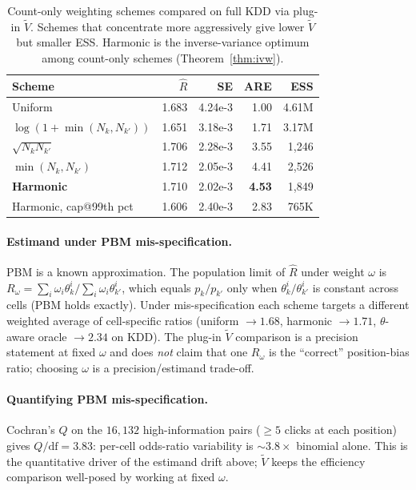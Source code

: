 \documentclass[sigconf]{acmart}
\begin{document}
\begin{table}[t]
\caption{Count-only weighting schemes compared on full KDD via plug-in
$\widetilde V$. Schemes that concentrate more aggressively give lower
$\widetilde V$ but smaller ESS. Harmonic is the inverse-variance
optimum among count-only schemes (Theorem~\ref{thm:ivw}).}
\label{tab:schemes}
\centering
\small
\begin{tabular}{lrrrr}
\toprule
Scheme                          & $\hat R$ & SE & ARE & ESS \\
\midrule
Uniform                         & 1.683 & 4.24e-3 & 1.00 & 4.61M \\
$\log(1+\min(N_k,N_{k'}))$      & 1.651 & 3.18e-3 & 1.71 & 3.17M \\
$\sqrt{N_k N_{k'}}$             & 1.706 & 2.28e-3 & 3.55 & 1{,}246 \\
$\min(N_k,N_{k'})$              & 1.712 & 2.05e-3 & 4.41 & 2{,}526 \\
\textbf{Harmonic}               & 1.710 & 2.02e-3 & \textbf{4.53} & 1{,}849 \\
Harmonic, cap@99th pct          & 1.606 & 2.40e-3 & 2.83 & 765K \\
\bottomrule
\end{tabular}
\end{table}

\paragraph{Estimand under PBM mis-specification.}
\label{par:estimand}
PBM is a known approximation. The population limit of $\hat R$ under
weight $\omega$ is $R_\omega=\sum_i\omega_i\theta_k^i / \sum_i\omega_i\theta_{k'}^i$,
which equals $p_k/p_{k'}$ only when $\theta_k^i/\theta_{k'}^i$ is constant
across cells (PBM holds exactly). Under mis-specification each scheme
targets a different weighted average of cell-specific ratios (uniform
$\to 1.68$, harmonic $\to 1.71$, $\theta$-aware oracle $\to 2.34$ on KDD).
The plug-in $\widetilde V$ comparison is a precision statement at fixed
$\omega$ and does \emph{not} claim that one $R_\omega$ is the ``correct''
position-bias ratio; choosing $\omega$ is a precision/estimand
trade-off.

\paragraph{Quantifying PBM mis-specification.}
\label{sec:cochran}
Cochran's $Q$ on the $16{,}132$ high-information pairs ($\ge 5$ clicks at
each position) gives $Q/\mathrm{df}=3.83$: per-cell odds-ratio variability
is $\sim 3.8\times$ binomial alone. This is the quantitative driver of the
estimand drift above; $\widetilde V$ keeps the efficiency comparison
well-posed by working at fixed $\omega$.
\end{document}
